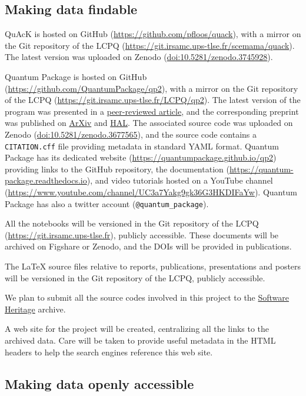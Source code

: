 \documentclass[12pt,onecolumn,notitlepage]{revtex4-1}
\begin{document}
\subsection{Making data findable}

QuAcK is hosted on GitHub (\url{https://github.com/pfloos/quack}), with a
mirror on the Git repository of the LCPQ
(\url{https://git.irsamc.ups-tlse.fr/scemama/quack}). The latest
version was uploaded on Zenodo (\url{doi:10.5281/zenodo.3745928}).

Quantum Package is hosted on GitHub
(\url{https://github.com/QuantumPackage/qp2}), with a mirror on the Git
repository of the LCPQ (\url{https://git.irsamc.ups-tlse.fr/LCPQ/qp2}).
The latest version of the program was presented in a \href{doi:10.1021/acs.jctc.9b00176}{peer-reviewed
article}, and the corresponding preprint was published on \href{https://arxiv.org/abs/1902.08154}{ArXiv} and \href{https://hal.archives-ouvertes.fr/hal-02045595}{HAL}.
The associated source code was uploaded on Zenodo
(\url{doi:10.5281/zenodo.3677565}), and the source code contains a
\texttt{CITATION.cff} file providing metadata in standard YAML format.
Quantum Package has its dedicated website
(\url{https://quantumpackage.github.io/qp2}) providing links to the
GitHub repository, the documentation
(\url{https://quantum-package.readthedocs.io}), and video tutorials
hosted on a YouTube channel
(\url{https://www.youtube.com/channel/UC3a7Yakg9gk36G3HKDIFaYw}). Quantum
Package has also a twitter account (\texttt{@quantum\_package}).

All the notebooks will be versioned in the Git repository of the LCPQ
(\url{https://git.irsamc.ups-tlse.fr}), publicly accessible.
These documents will be archived on Figshare or Zenodo, and the
DOIs will be provided in publications.

The \LaTeX{} source files relative to reports, publications,
presentations and posters will be versioned in the Git repository
of the LCPQ, publicly accessible.

We plan to submit all the source codes involved in this project to
the \href{https://www.softwareheritage.org}{Software Heritage} archive. 

A web site for the project will be created, centralizing all the
links to the archived data. Care will be taken to provide useful
metadata in the HTML headers to help the search engines reference
this web site.

\subsection{Making data openly accessible}
\end{document}
